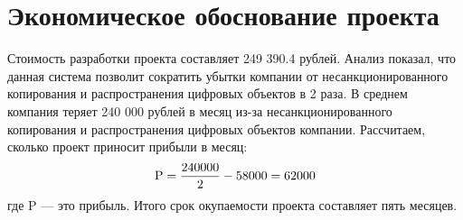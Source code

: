 \section{Экономическое обоснование проекта}
Стоимость разработки проекта составляет 249 390.4 рублей.
Анализ показал, что данная система позволит сократить убытки
компании от несанкционированного копирования и распространения цифровых объектов
в 2 раза. В среднем компания теряет 240 000 рублей в месяц из-за несанкционированного
копирования и распространения цифровых объектов компании. Рассчитаем, сколько проект приносит прибыли в месяц:
\begin{align*}
    \textup{P} = \dfrac{240000}{2} - 58000 = 62000
\end{align*}
где P --- это прибыль.
Итого срок окупаемости проекта составляет пять месяцев.